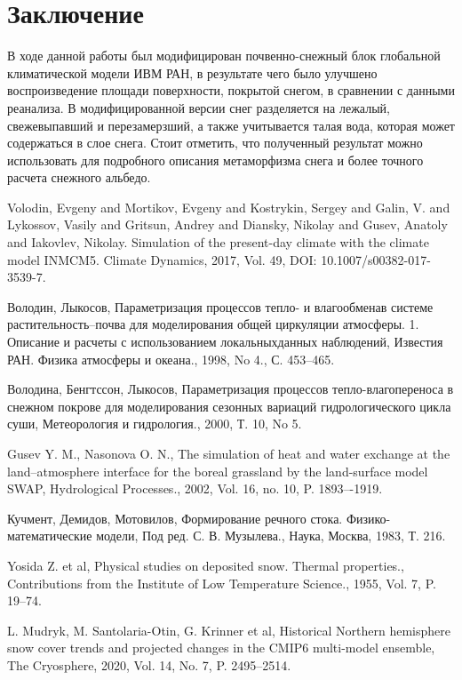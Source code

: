 \documentclass[a4paper, fontsize=12pt]{scrartcl}
\begin{document}
\section{Заключение}

В ходе данной работы был модифицирован почвенно-снежный блок глобальной климатической модели ИВМ РАН, в результате чего было улучшено воспроизведение площади поверхности, покрытой снегом, в сравнении с данными реанализа. В модифицированной версии снег разделяется на лежалый, свежевыпавший и перезамерзший, а также учитывается талая вода, которая может содержаться в слое снега. Стоит отметить,  что полученный результат можно использовать для подробного описания метаморфизма снега и более точного расчета снежного альбедо. 



\begin{thebibliography}{9}

Volodin, Evgeny and Mortikov, Evgeny and Kostrykin, Sergey and Galin, V. and Lykossov, Vasily and Gritsun, Andrey and Diansky, Nikolay and Gusev, Anatoly and Iakovlev, Nikolay. Simulation of the present-day climate with the climate model INMCM5. Climate Dynamics, 2017, Vol. 49, DOI: 10.1007/s00382-017-3539-7.

 Володин, Лыкосов,  Параметризация процессов тепло- и влагообменав системе растительность–почва для моделирования общей циркуляции атмосферы. 1. Описание и расчеты с использованием локальныхданных наблюдений, Известия РАН. Физика атмосферы и океана., 1998, No 4., С. 453–465.

 Володина, Бенгтссон, Лыкосов, Параметризация процессов тепло-влагопереноса в снежном покрове для моделирования сезонных вариаций гидрологического цикла суши, Метеорология и гидрология., 2000, Т. 10, No 5. 

Gusev Y. M., Nasonova O. N., The simulation of heat and water exchange at the land–atmosphere interface for the boreal grassland by the land-surface model SWAP, Hydrological Processes., 2002, Vol. 16, no. 10, P. 1893–-1919.

Кучмент, Демидов, Мотовилов, Формирование речного стока. Физико-математические модели, Под ред. С. В. Музылева., Наука, Москва, 1983, Т. 216.

Yosida Z. et al, Physical studies on deposited snow. Thermal properties., Contributions from the Institute of Low Temperature Science., 1955, Vol. 7, P. 19–74.

L. Mudryk, M. Santolaria-Otin, G. Krinner et al, Historical Northern hemisphere snow cover trends and projected changes in the CMIP6  multi-model  ensemble, The Cryosphere, 2020, Vol. 14, No. 7, P. 2495–2514.

\end{thebibliography}
\end{document}
